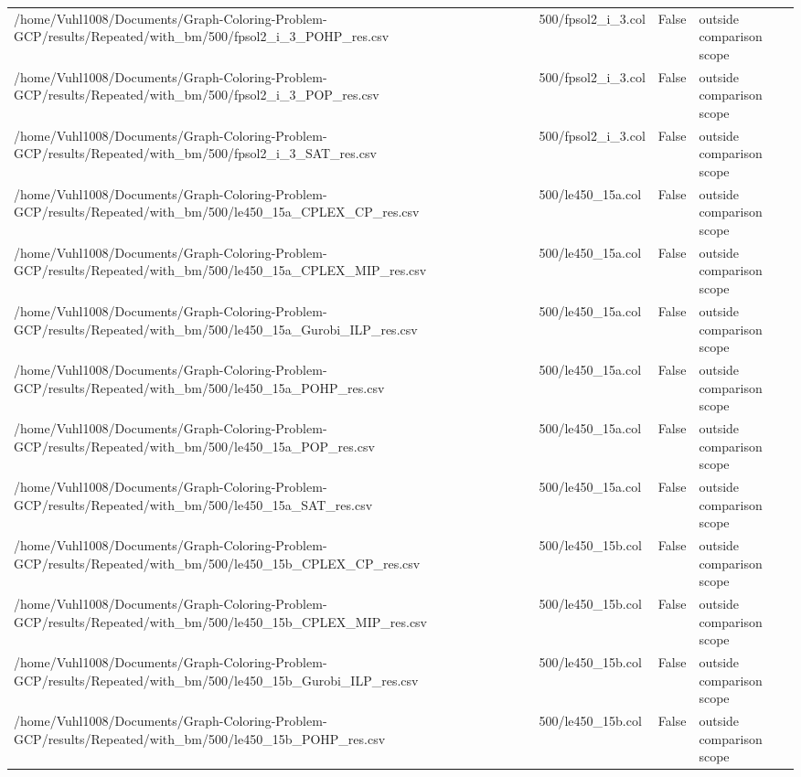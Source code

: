 \begin{table}[htbp]
\begin{tabular}{llll}
/home/Vuhl1008/Documents/Graph-Coloring-Problem-GCP/results/Repeated/with\_bm/500/fpsol2\_i\_3\_POHP\_res.csv & 500/fpsol2\_i\_3.col & False & outside comparison scope \\
/home/Vuhl1008/Documents/Graph-Coloring-Problem-GCP/results/Repeated/with\_bm/500/fpsol2\_i\_3\_POP\_res.csv & 500/fpsol2\_i\_3.col & False & outside comparison scope \\
/home/Vuhl1008/Documents/Graph-Coloring-Problem-GCP/results/Repeated/with\_bm/500/fpsol2\_i\_3\_SAT\_res.csv & 500/fpsol2\_i\_3.col & False & outside comparison scope \\
/home/Vuhl1008/Documents/Graph-Coloring-Problem-GCP/results/Repeated/with\_bm/500/le450\_15a\_CPLEX\_CP\_res.csv & 500/le450\_15a.col & False & outside comparison scope \\
/home/Vuhl1008/Documents/Graph-Coloring-Problem-GCP/results/Repeated/with\_bm/500/le450\_15a\_CPLEX\_MIP\_res.csv & 500/le450\_15a.col & False & outside comparison scope \\
/home/Vuhl1008/Documents/Graph-Coloring-Problem-GCP/results/Repeated/with\_bm/500/le450\_15a\_Gurobi\_ILP\_res.csv & 500/le450\_15a.col & False & outside comparison scope \\
/home/Vuhl1008/Documents/Graph-Coloring-Problem-GCP/results/Repeated/with\_bm/500/le450\_15a\_POHP\_res.csv & 500/le450\_15a.col & False & outside comparison scope \\
/home/Vuhl1008/Documents/Graph-Coloring-Problem-GCP/results/Repeated/with\_bm/500/le450\_15a\_POP\_res.csv & 500/le450\_15a.col & False & outside comparison scope \\
/home/Vuhl1008/Documents/Graph-Coloring-Problem-GCP/results/Repeated/with\_bm/500/le450\_15a\_SAT\_res.csv & 500/le450\_15a.col & False & outside comparison scope \\
/home/Vuhl1008/Documents/Graph-Coloring-Problem-GCP/results/Repeated/with\_bm/500/le450\_15b\_CPLEX\_CP\_res.csv & 500/le450\_15b.col & False & outside comparison scope \\
/home/Vuhl1008/Documents/Graph-Coloring-Problem-GCP/results/Repeated/with\_bm/500/le450\_15b\_CPLEX\_MIP\_res.csv & 500/le450\_15b.col & False & outside comparison scope \\
/home/Vuhl1008/Documents/Graph-Coloring-Problem-GCP/results/Repeated/with\_bm/500/le450\_15b\_Gurobi\_ILP\_res.csv & 500/le450\_15b.col & False & outside comparison scope \\
/home/Vuhl1008/Documents/Graph-Coloring-Problem-GCP/results/Repeated/with\_bm/500/le450\_15b\_POHP\_res.csv & 500/le450\_15b.col & False & outside comparison scope \\

\end{tabular}
\end{table}
